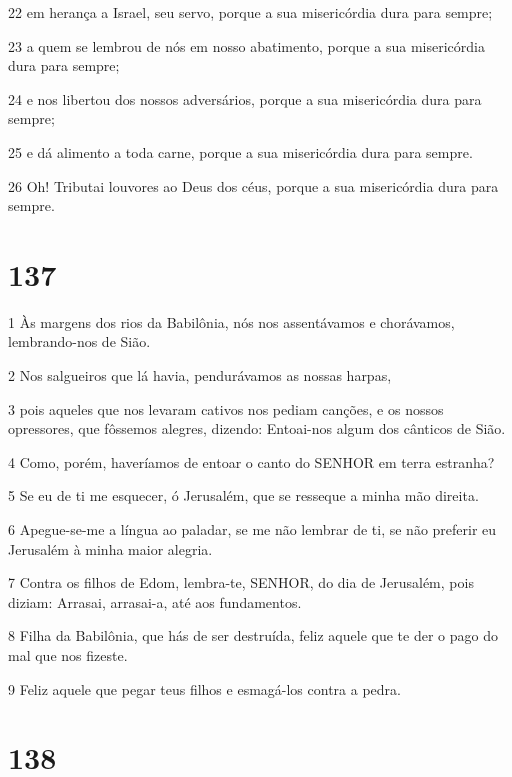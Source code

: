 \par 22 em herança a Israel, seu servo, porque a sua misericórdia dura para sempre;
\par 23 a quem se lembrou de nós em nosso abatimento, porque a sua misericórdia dura para sempre;
\par 24 e nos libertou dos nossos adversários, porque a sua misericórdia dura para sempre;
\par 25 e dá alimento a toda carne, porque a sua misericórdia dura para sempre.
\par 26 Oh! Tributai louvores ao Deus dos céus, porque a sua misericórdia dura para sempre.

\chapter{137}

\par 1 Às margens dos rios da Babilônia, nós nos assentávamos e chorávamos, lembrando-nos de Sião.
\par 2 Nos salgueiros que lá havia, pendurávamos as nossas harpas,
\par 3 pois aqueles que nos levaram cativos nos pediam canções, e os nossos opressores, que fôssemos alegres, dizendo: Entoai-nos algum dos cânticos de Sião.
\par 4 Como, porém, haveríamos de entoar o canto do SENHOR em terra estranha?
\par 5 Se eu de ti me esquecer, ó Jerusalém, que se resseque a minha mão direita.
\par 6 Apegue-se-me a língua ao paladar, se me não lembrar de ti, se não preferir eu Jerusalém à minha maior alegria.
\par 7 Contra os filhos de Edom, lembra-te, SENHOR, do dia de Jerusalém, pois diziam: Arrasai, arrasai-a, até aos fundamentos.
\par 8 Filha da Babilônia, que hás de ser destruída, feliz aquele que te der o pago do mal que nos fizeste.
\par 9 Feliz aquele que pegar teus filhos e esmagá-los contra a pedra.

\chapter{138}

